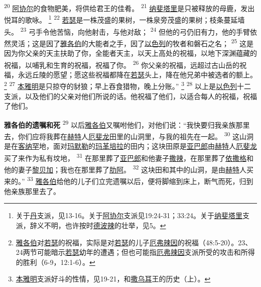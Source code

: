 \textsuperscript{20}
\uline{阿协尔}的食物肥美，将供给君王的佳肴。
\textsuperscript{21}
\uline{纳斐塔里}是只被释放的母鹿，发出悦耳的歌咏。
\footnote{关于\uline{丹}支派，见13-16。关于\uline{阿协尔}支派见19:24-31；33:24。关于\uline{纳斐塔里}支派，辞义不明，也许按时\uline{德波辣}的壮举，见5。}
\textsuperscript{22}
\uline{若瑟}是一株茂盛的果树，一株泉旁茂盛的果树；枝条蔓延墙头。
\textsuperscript{23}
弓手令他苦恼，向他射击，与他对敌；
\textsuperscript{24}
但他的弓仍旧有力，他的手臂依然灵活；这是因了\uline{雅各伯}的大能者之手，因了\uline{以色列}的牧者和磐石之名；
\textsuperscript{25}
这是因为你父亲的天主扶助了你，全能者天主，以天上高处的祝福，以地下深渊蕴藏的祝福，以哺乳和生育的祝福，祝福了你。
\textsuperscript{26}
你父亲的祝福，远超过古山岳的祝福，永远丘陵的愿望；愿这些祝福都降在\uline{若瑟}头上，降在他兄弟中被选者的额上。
\footnote{\uline{雅各伯}对\uline{若瑟}的祝福，实际是对\uline{若瑟}的儿子\uline{厄弗辣因}的祝福（48:5-20）。23、24两节可能暗示\uline{若瑟}幼年的遭遇；但也可能指\uline{厄弗辣因}支派所受的攻击和所得的胜利（6-9，12:1-6）。}
\textsuperscript{27}
\uline{本雅明}是只掠夺的豺狼；早上吞食猎物，晚上分账。”
\footnote{\uline{本雅明}支派好斗的性情，见19-21，和\uline{撒乌耳}王的历史（上）。}
\textsuperscript{28}
以上是\uline{以色列}十二支派，以及他们的父亲对他们所说的话。他祝福了他们，以适合每人的祝福，祝福了他们。

\textbf{雅各伯的遗嘱和死\quad}
\textsuperscript{29}
以后\uline{雅各伯}又嘱咐他们，对他们说：“我快要归我亲族那里去，你们应将我葬在\uline{赫特}人\uline{厄斐龙}田里的山洞里，与我的祖先在一起。
\textsuperscript{30}
这山洞是在\uline{客纳罕}地，面对\uline{玛默勒}的\uline{玛革培拉}的田内；这块田原是\uline{亚巴郎}由\uline{赫特}人\uline{厄斐龙}买了来作为私有坟地，
\textsuperscript{31}
在那里葬了\uline{亚巴郎}和他妻子\uline{撒辣}，在那里葬了\uline{依撒格}和他的妻子\uline{黎贝加}；我也在那里葬了\uline{肋阿}。
\textsuperscript{32}
这块田和其中的山洞，是由\uline{赫特}人买来的。”
\textsuperscript{33}
\uline{雅各伯}给他的儿子们立完遗嘱以后，便将脚缩到床上，断气而死，归到他亲族那里去了。

